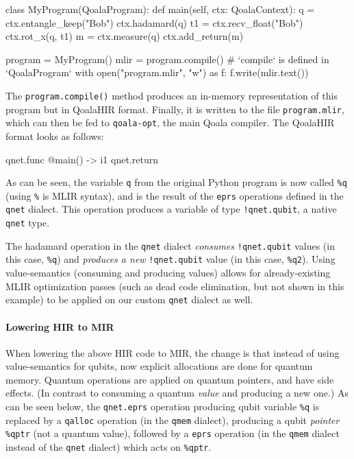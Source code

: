 \begin{pycode}
class MyProgram(QoalaProgram):
    def main(self, ctx: QoalaContext):
        q = ctx.entangle_keep("Bob")
        ctx.hadamard(q)
        t1 = ctx.recv_float("Bob")
        ctx.rot_x(q, t1)
        m = ctx.measure(q)
        ctx.add_return(m)

program = MyProgram()
mlir = program.compile()  # `compile` is defined in `QoalaProgram`
with open("program.mlir", "w") as f:
    f.write(mlir.text())
\end{pycode}

The \texttt{program.compile()} method produces an in-memory representation of this program but in QoalaHIR format.
Finally, it is written to the file \texttt{program.mlir}, which can then be fed to \texttt{qoala-opt}, the main Qoala compiler.
The QoalaHIR format looks as follows:

\begin{pycode}
qnet.func @main() -> i1 {
    qnet.return %
}
\end{pycode}

As can be seen, the variable \texttt{q} from the original Python program is now called \texttt{\%q} (using \texttt{\%} is MLIR syntax), and is the result of the \texttt{eprs} operations defined in the \texttt{qnet} dialect.
This operation produces a variable of type \texttt{!qnet.qubit}, a native \texttt{qnet} type.

The hadamard operation in the \texttt{qnet} dialect \emph{consumes} \texttt{!qnet.qubit} values (in this case, \texttt{\%q}) and \emph{produces a new} \texttt{!qnet.qubit} value (in this case, \texttt{\%q2}).
Using value-semantics (consuming and producing values) allows for already-existing MLIR optimization passes (such as dead code elimination, but not shown in this example) to be applied on our custom \texttt{qnet} dialect as well.

\paragraph{Lowering HIR to MIR}

When lowering the above HIR code to MIR, the change is that instead of using value-semantics for qubits, now explicit allocations are done for quantum memory.
Quantum operations are applied on quantum pointers, and have side effects.
(In contrast to consuming a quantum \emph{value} and producing a new one.)
As can be seen below, the \texttt{qnet.eprs} operation producing qubit variable \texttt{\%q} is replaced by a \texttt{qalloc} operation (in the \texttt{qmem} dialect), producing a qubit \emph{pointer} \texttt{\%qptr} (not a quantum value), followed by a \texttt{eprs} operation (in the \texttt{qmem} dialect instead of the \texttt{qnet} dialect) which acts on \texttt{\%qptr}.

